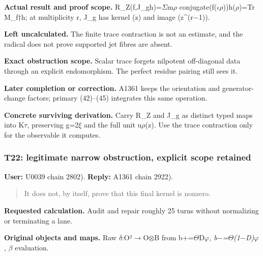 \documentclass[10pt,a4paper,oneside]{report}
\begin{document}
\textbf{Actual result and proof scope.}
R\_Z(f,J\_gh)=\allowbreak{}\ensuremath{Σ}\allowbreak{}m\allowbreak{}\ensuremath{ρ}\allowbreak{}
conjugate(f(\allowbreak{}\ensuremath{ι}\allowbreak{}\allowbreak{}\ensuremath{ρ}\allowbreak{}))h(\allowbreak{}\ensuremath{ρ}\allowbreak{})=Tr
M\_f†h; at multiplicity r, J\_g has kernel (z) and image
(z\textasciicircum{}(r\allowbreak{}\ensuremath{−}\allowbreak{}1)).

\textbf{Left uncalculated.} The finite trace contraction is not an
estimate, and the radical does not prove supported jet fibres are
absent.

\textbf{Exact obstruction scope.} Scalar trace forgets nilpotent
off-diagonal data through an explicit endomorphism. The perfect residue
pairing still sees it.

\textbf{Later completion or correction.} A1361 keeps the orientation and
generator-change factors; primary (42)--(45) integrates this same
operation.

\textbf{Concrete surviving derivation.} Carry R\_Z and J\_g as distinct
typed maps into K\allowbreak{}\ensuremath{τ}\allowbreak{}, preserving
g=2\allowbreak{}\ensuremath{ξ}\allowbreak{} and the full unit
u\allowbreak{}\ensuremath{ρ}\allowbreak{}(z). Use the trace contraction
only for the observable it computes.

\subsubsection{T22: legitimate narrow obstruction, explicit scope
retained}\label{t22-legitimate-narrow-obstruction-explicit-scope-retained}

\textbf{User:} U0039
\protect{} chain 2802).
\textbf{Reply:} A1361
\protect{} chain 2922).

\begin{quote}
It does not, by itself, prove that this final kernel is nonzero.
\end{quote}

\textbf{Requested calculation.} Audit and repair roughly 25 turns
without normalizing or terminating a lane.

\textbf{Original objects and maps.} Raw
\allowbreak{}\ensuremath{δ}\allowbreak{}:O²\allowbreak{}\ensuremath{→}\allowbreak{}O\allowbreak{}\ensuremath{⊗}\allowbreak{}B
from
b+=\allowbreak{}\ensuremath{Θ}\allowbreak{}D\allowbreak{}\ensuremath{φ}\allowbreak{}\emph{,
b\allowbreak{}\ensuremath{−}\allowbreak{}=\allowbreak{}\ensuremath{Θ}\allowbreak{}(1\allowbreak{}\ensuremath{−}\allowbreak{}D)\allowbreak{}\ensuremath{φ}\allowbreak{}},
\allowbreak{}\ensuremath{β}\allowbreak{} evaluation.
\end{document}
